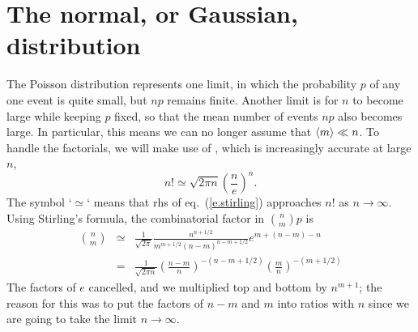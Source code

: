 \section{The normal, or Gaussian, distribution}

The Poisson distribution represents one limit, in which the probability $p$ of any one event is quite small, but $np$ remains finite. Another limit is for $n$ to become large while keeping $p$ fixed, so that the mean number of events $np$ also becomes large. In particular, this means we can no longer assume that $\left\langle m\right\rangle\ll n$. To handle the factorials, we will make use of , which is increasingly accurate at large $n$,
\begin{equation}\label{e.stirling}
n! \simeq \sqrt{2\pi n}\left(\frac{n}{e}\right)^{n}.
\end{equation}
The symbol `$\simeq$` means that rhs of eq.~(\ref{e.stirling}) approaches $n!$ as $n\to\infty$.
Using Stirling's formula, the combinatorial factor in $\binom{n}{m}{p}$ is
\begin{eqnarray*}
	{n\choose m} &\simeq& \frac{1}{\sqrt{2\pi}}\frac{n^{n+1/2}}{m^{m+1/2}(n-m)^{n-m+1/2}} e^{m+(n-m)-n}\\
	&=& \frac{1}{\sqrt{2\pi n}}\left(\frac{n-m}{n}\right)^{-(n-m+1/2)} \left(\frac{m}{n}\right)^{-(m+1/2)}
\end{eqnarray*}
The factors of $e$ cancelled, and we multiplied top and bottom by $n^{m+1}$; the reason for this was to put the factors of $n-m$ and $m$ into ratios with $n$ since we are going to take the limit $n\to\infty$.

